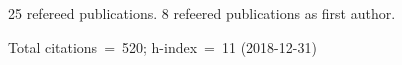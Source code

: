 25 refereed publications. 8 refeered publications as first author.

Total citations~=~520; h-index~=~11 (2018-12-31)